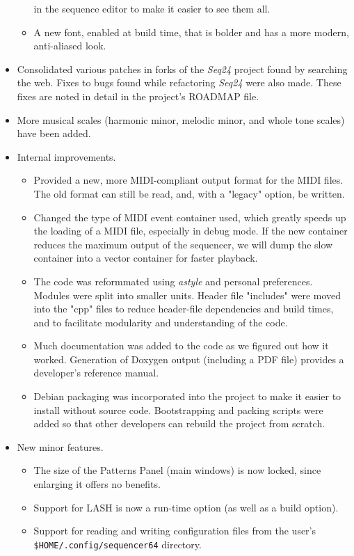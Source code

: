 \documentclass[
 11pt,
 twoside,
 a4paper,
 headinclude,
 footinclude,
 final                                 %
]{article}
\begin{document}
\begin{itemize}
\begin{itemize}
            in the sequence editor to make it easier to see them all.
         \item A new font, enabled at build time, that is bolder and has a
            more modern, anti-aliased look.
      \end{itemize}
      \item Consolidated various patches in forks of the \textsl{Seq24}
         project found by searching the web.  Fixes to bugs found while
         refactoring \textsl{Seq24} were also made.  These fixes are noted in
         detail in the project's ROADMAP file.
      \item More musical scales (harmonic minor, melodic minor, and
         whole tone scales) have been added.
      \item Internal improvements.
      \begin{itemize}
         \item Provided a new, more MIDI-compliant output format for the MIDI
            files.  The old format can still be read, and, with a "legacy" option,
            be written.
         \item Changed the type of MIDI event container used, which greatly speeds
            up the loading of a MIDI file, especially in debug mode.
            If the new container reduces the maximum output of the sequencer,
            we will dump the slow container into a vector container for faster
            playback.
         \item The code was reformmated using \textsl{astyle} and
            personal preferences.  Modules were split into smaller units.
            Header file "includes" were moved into the "cpp" files to reduce
            header-file dependencies and build times, and to facilitate
            modularity and understanding of the code.
         \item Much documentation was added to the code as we figured
            out how it worked.  Generation of Doxygen output (including a PDF
            file) provides a developer's reference manual.
         \item Debian packaging was incorporated into the project to make it
            easier to install without source code.  Bootstrapping and
            packing scripts were added so that other developers can rebuild the
            project from scratch.
      \end{itemize}
      \item New minor features.
      \begin{itemize}
         \item The size of the Patterns Panel (main windows) is now locked,
            since enlarging it offers no benefits.
         \item Support for LASH is now a run-time option (as well as a build
            option).
         \item Support for reading and writing configuration files from the
            user's \texttt{\$HOME/.config/sequencer64} directory.
      \end{itemize}
   \end{itemize}
\end{document}
